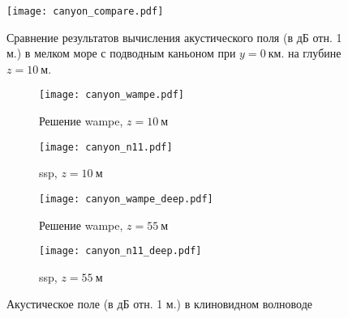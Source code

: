 \documentclass[../document.tex]{subfiles}
\begin{document}
                \begin{figure}[h]
                    \centering
                    \texttt{[image: canyon\_compare.pdf]}
                    \caption{Сравнение результатов вычисления акустического поля (в дБ отн. 1 м.) в мелком море с подводным каньоном при $y=0\ \text{км.}$ на глубине $z=10\ \text{м}$.\label{fig::canyon_compare}}
                \end{figure}
                \begin{figure}[h]
                    \centering
                    \begin{subfigure}[t]{0.75\textwidth}
                        \centering
                        \texttt{[image: canyon\_wampe.pdf]}
                        \caption{Решение \acrshort{wampe}, $z=10\ \text{м}$}
                    \end{subfigure}
                    \hfill
                    \begin{subfigure}[t]{0.75\textwidth}
                        \centering
                        \texttt{[image: canyon\_n11.pdf]}
                        \caption{\acrshort{ssp}, $z=10\ \text{м}$}
                    \end{subfigure}
                    \hfill
                    \begin{subfigure}[t]{0.75\textwidth}
                        \centering
                        \texttt{[image: canyon\_wampe\_deep.pdf]}
                        \caption{Решение \acrshort{wampe}, $z=55\ \text{м}$}
                    \end{subfigure}
                    \hfill
                    \begin{subfigure}[t]{0.75\textwidth}
                        \centering
                        \texttt{[image: canyon\_n11\_deep.pdf]}
                        \caption{\acrshort{ssp}, $z=55\ \text{м}$}
                    \end{subfigure}
                    \caption{Акустическое поле (в дБ отн. 1 м.) в клиновидном волноводе\label{fig::canyon_field}}
                \end{figure}
                \FloatBarrier
\end{document}
